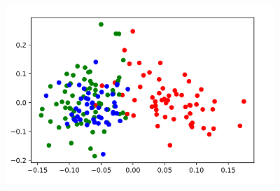 \documentclass{article}
\begin{document}
\begin{itemize}
            \begin{center}
                  \includegraphics[width=4in]{13.png}
            \end{center}
\end{itemize}
\end{document}
